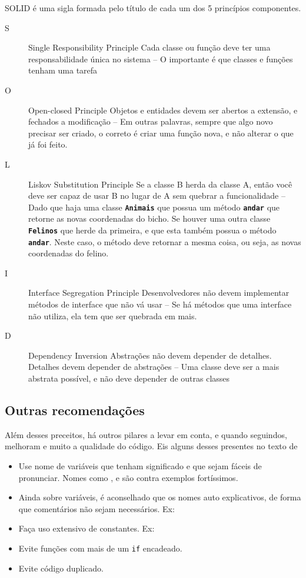 SOLID é uma sigla formada pelo título de cada um dos 5 princípios componentes.
\begin{description}
    \item[S] Single Responsibility Principle \dir Cada classe ou função deve ter uma responsabilidade única no
    sistema -- O importante é que classes e funções tenham uma tarefa
    \item[O] Open-closed Principle \dir Objetos e entidades devem ser abertos a extensão, e fechados a modificação
    -- Em outras palavras, sempre que algo novo precisar ser criado, o correto é criar uma função nova, e não
    alterar o que já foi feito.
    \item[L] Liskov Substitution Principle \dir Se a classe B herda da classe A, então você deve ser capaz de usar
    B no lugar de A sem quebrar a funcionalidade -- Dado que haja uma classe \textbf{\texttt{Animais}} que possua
    um método \textbf{\texttt{andar}} que retorne as novas coordenadas do bicho. Se houver uma outra classe
    \textbf{\texttt{Felinos}} que herde da primeira, e que esta também possua o método \textbf{\texttt{andar}}.
    Neste caso, o método deve retornar a mesma coisa, ou seja, as novas coordenadas do felino.
    \item[I] Interface Segregation Principle \dir Desenvolvedores não devem implementar métodos de interface que
    não vá usar -- Se há métodos que uma interface não utiliza, ela tem que ser quebrada em mais.
    \item[D] Dependency Inversion \dir Abstrações não devem depender de detalhes. Detalhes devem depender de
    abstrações -- Uma classe deve ser a mais abstrata possível, e não deve depender de outras classes
\end{description}


\subsection{Outras recomendações}\label{subsec:recomendacoes}

Além desses preceitos, há outros pilares a levar em conta, e quando seguindos, melhoram e muito a qualidade do
código. Eis alguns desses presentes no texto de \cite{BP}
\begin{itemize}
    \item Use nome de variáveis que tenham significado e que sejam fáceis de pronunciar. Nomes como \texttt{},
    \texttt{} e \texttt{} são contra exemplos fortíssimos.
    \item Ainda sobre variáveis, é aconselhado que os nomes auto explicativos, de forma que comentários não sejam
    necessários. Ex: \texttt{} \dir \texttt{}
    \item Faça uso extensivo de constantes. Ex: \texttt{} \dir \texttt{}
    \item Evite funções com mais de um \texttt{if} encadeado.
    \item Evite código duplicado.
\end{itemize}


